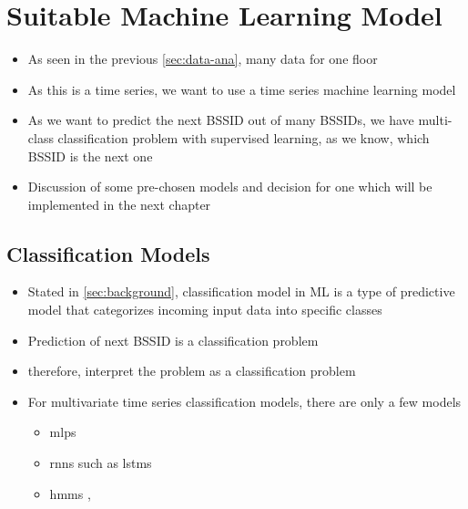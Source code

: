 \chapter{Suitable Machine Learning Model}\label{sec:discuss-ml}


\begin{itemize}
    \item As seen in the previous \cref{sec:data-ana}, many data for one floor 
    \item As this is a time series, we want to use a time series machine learning model
    \item As we want to predict the next BSSID out of many BSSIDs, we have multi-class classification problem with supervised learning, as we know, which BSSID is the next one
    \item Discussion of some pre-chosen models and decision for one which will be implemented in the next chapter
\end{itemize}

\section{Classification Models}
\begin{itemize}
    \item Stated in \cref{sec:background}, classification model in ML is a type of predictive model that categorizes incoming input data into specific classes
    \item Prediction of next BSSID is a classification problem
    \item therefore, interpret the problem as a classification problem
    \item For multivariate time series classification models, there are only a few models
    \begin{itemize}
        \item \acp{mlp} \cite{TSC}
        \item \acp{rnn} such as \acp{lstm}\cite{lstm-hochreiter}
        \item \acp{hmm} \cite{hmm-movement-prediction}, 
    \end{itemize}
\end{itemize}

